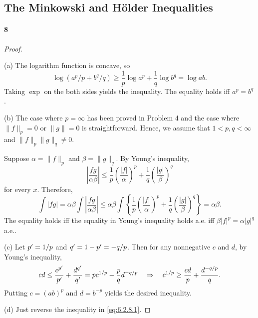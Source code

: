 \subsection{The Minkowski and Hölder Inequalities}
  \paragraph{8}
  \begin{proof}
    $\,$\par
    (a) The logarithm function is concave, so 
    \[
      \log(a^p/p+b^q/q) \ge \frac{1}{p}\log a^p + \frac{1}{q}\log b^q = \log ab.
    \]
    Taking $\exp$ on the both sides yields the inequality. The equality holds 
    iff $a^p=b^q$. \par
    (b) The case where $p=\infty$ has been proved in Problem 4 and the case 
    where $\|f\|_p=0$ or $\|g\|=0$ is straightforward. Hence, we assume that 
    $1<p,q<\infty$ and $\|f\|_p\|g\|_q\ne 0$. \par
    Suppose $\alpha=\|f\|_p$ and $\beta=\|g\|_q$. By Young's inequality, 
    \[
      \left|\frac{fg}{\alpha\beta}\right| \le 
      \frac{1}{p}\left(\frac{|f|}{\alpha}\right)^p + 
      \frac{1}{q}\left(\frac{|g|}{\beta}\right)^q
    \]
    for every $x$. Therefore,
    \begin{equation}
      \label{eq:6.2.8.1}
      \int|fg| = \alpha\beta\int\left|\frac{fg}{\alpha\beta}\right|
      \le \alpha\beta\int\left\{\frac{1}{p}\left(\frac{|f|}{\alpha}\right)^p + 
      \frac{1}{q}\left(\frac{|g|}{\beta}\right)^q\right\}
      = \alpha\beta.
    \end{equation}
    The equality holds iff the equality in Young's inequality holds a.e. iff 
    $\beta|f|^p = \alpha|g|^q$ a.e..\par
    (c) Let $p^\prime=1/p$ and $q^\prime=1-p^\prime=-q/p$. Then for any nonnegative $c$ and
    $d$, by Young's inequality,
    \[
      cd \le \frac{c^{p^\prime}}{p^\prime}+\frac{d^{q^\prime}}{q^\prime}=
      pc^{1/p} - \frac{p}{q}d^{-q/p} \quad\Rightarrow\quad
      c^{1/p} \ge \frac{cd}{p} + \frac{d^{-q/p}}{q}.
    \]
    Putting $c=(ab)^p$ and $d=b^{-p}$ yields the desired inequality.\par
    (d) Just reverse the inequality in \eqref{eq:6.2.8.1}.
  \end{proof}
